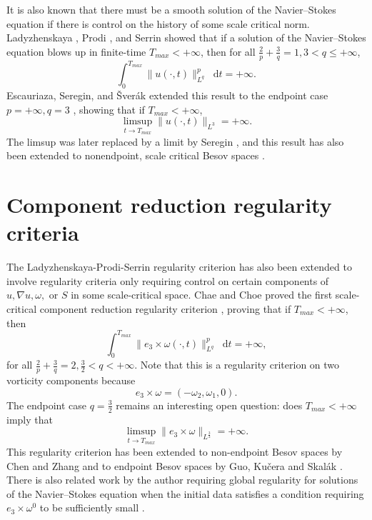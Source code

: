 \documentclass[11pt]{article}
\theoremstyle{plain}
\theoremstyle{remark}
\numberwithin{equation}{section}
\newcommand{\diff}{\mathop{}\!\mathrm{d}}
\begin{document}
It is also known that there must be a smooth solution of the Navier--Stokes equation if there is control on the history of some scale critical norm.
Ladyzhenskaya \cite{Ladyzhenskaya}, Prodi \cite{Prodi}, and Serrin \cite{Serrin} showed that if a solution of the Navier--Stokes equation blows up in finite-time $T_{max}<+\infty$,
then for all $\frac{2}{p}+\frac{3}{q}=1, 3<q\leq+\infty$,
\begin{equation}
    \int_0^{T_{max}}\|u(\cdot,t)\|_{L^q}^p
    \diff t=+\infty.
\end{equation}
Escauriaza, Seregin, and \v{S}ver\'ak extended this result to the endpoint case $p=+\infty, q=3$ \cite{ESS}, showing that if $T_{max}<+\infty$,
\begin{equation}
    \limsup_{t\to T_{max}}\|u(\cdot,t)\|_{L^3}
    =+\infty.
\end{equation}
The limsup was later replaced by a limit by Seregin \cite{SereginLim},
and this result has also been extended to nonendpoint, scale critical Besov spaces \cites{GKP,Albritton}.





\section{Component reduction regularity criteria}


The Ladyzhenskaya-Prodi-Serrin regularity criterion has also been extended to involve regularity criteria only requiring control on certain components of $u, \nabla u, \omega,$ or $S$ in some scale-critical space.
Chae and Choe proved the first scale-critical component reduction regularity criterion \cite{ChaeChoe}, proving that if $T_{max}<+\infty$, then
\begin{equation}
    \int_0^{T_{max}} \|e_3\times 
    \omega(\cdot,t)\|_{L^q}^p \diff t
    =+\infty,
\end{equation}
for all $\frac{2}{p}+\frac{3}{q}=2, 
\frac{3}{2}<q<+\infty$.
Note that this is a regularity criterion on two vorticity components because
\begin{equation}
    e_3\times\omega=(-\omega_2,\omega_1,0).
\end{equation}
The endpoint case $q=\frac{3}{2}$ remains an interesting open question: does $T_{max}<+\infty$ imply that
\begin{equation}
    \limsup_{t\to T_{max}}
    \|e_3\times \omega\|_{L^\frac{3}{2}}
    =+\infty.
\end{equation}
This regularity criterion has been extended to non-endpoint Besov spaces by Chen and Zhang \cite{ChenZhangBesov} and to endpoint Besov spaces by Guo, Ku\v{c}era and Skal\'ak \cite{GuoBesov}.
There is also related work by the author requiring global regularity for solutions of the Navier--Stokes equation when the initial data satisfies a condition requiring $e_3\times \omega^0$ to be sufficiently small \cite{MillerAlmost2D}.
\end{document}
